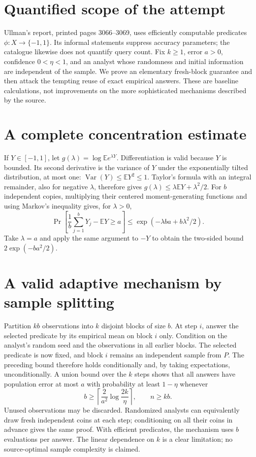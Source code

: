 \documentclass[11pt]{article}
\begin{document}
\section{Quantified scope of the attempt}
Ullman's report, printed pages 3066--3069, uses efficiently computable
predicates $\phi:X\to\{-1,1\}$. Its informal statements suppress accuracy
parameters; the catalogue likewise does not quantify query count.
Fix $k\ge1$, error $a>0$, confidence $0<\eta<1$, and an analyst whose
randomness and initial information are independent of the sample.
We prove an elementary fresh-block guarantee and then attack the tempting
reuse of exact empirical answers. These are baseline calculations, not
improvements on the more sophisticated mechanisms described by the source.

\section{A complete concentration estimate}
If $Y\in[-1,1]$, let $g(\lambda)=\log\mathbb E e^{\lambda Y}$.
Differentiation is valid because $Y$ is bounded. Its second derivative is
the variance of $Y$ under the exponentially tilted distribution, at most
one: $\operatorname{Var}(Y)\le\mathbb EY^2\le1$.
Taylor's formula with an integral remainder, also for negative $\lambda$,
therefore gives
$g(\lambda)\le\lambda\mathbb EY+\lambda^2/2$.
For $b$ independent copies, multiplying their centered moment-generating
functions and using Markov's inequality gives, for $\lambda>0$,
\[
\Pr\!\left[\frac1b\sum_{j=1}^bY_j-\mathbb EY\ge a\right]
\le \exp(-\lambda ba+b\lambda^2/2).
\]
Take $\lambda=a$ and apply the same argument to $-Y$ to obtain the
two-sided bound $2\exp(-ba^2/2)$.

\section{A valid adaptive mechanism by sample splitting}
Partition $kb$ observations into $k$ disjoint blocks of size $b$.
At step $i$, answer the selected predicate by its empirical mean on block
$i$ only. Condition on the analyst's random seed and the observations
in all earlier blocks. The selected predicate is now fixed, and block
$i$ remains an independent sample from $P$. The preceding bound therefore
holds conditionally and, by taking expectations, unconditionally.
A union bound over the $k$ steps shows that all answers have population
error at most $a$ with probability at least $1-\eta$ whenever
\[
b\ge\left\lceil\frac{2}{a^2}\log\frac{2k}{\eta}\right\rceil,
\qquad n\ge kb.
\]
Unused observations may be discarded. Randomized analysts can equivalently
draw fresh independent coins at each step; conditioning on all their coins
in advance gives the same proof. With efficient predicates, the mechanism
uses $b$ evaluations per answer. The linear dependence on $k$ is a clear
limitation; no source-optimal sample complexity is claimed.
\end{document}
